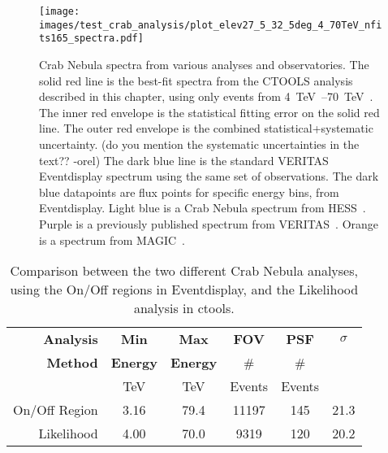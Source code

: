   \begin{figure}[!t]
    \centering
    \texttt{[image: images/test\_crab\_analysis/plot\_elev27\_5\_32\_5deg\_4\_70TeV\_nfits165\_spectra.pdf]}
    \caption[Crab Nebula Spectra]
    {
      Crab Nebula spectra from various analyses and observatories.
      The solid red line is the best-fit spectra from the CTOOLS analysis described in this chapter, using only events from \SIrange{4}{70}{\TeV{}}.
      The inner red envelope is the statistical fitting error on the solid red line.
      The outer red envelope is the combined statistical+systematic uncertainty.
      {\color{red}(do you mention the systematic uncertainties in the text?? -orel)}
      The dark blue line is the standard VERITAS Eventdisplay spectrum using the same set of observations.
      The dark blue datapoints are flux points for specific energy bins, from Eventdisplay.
      Light blue is a Crab Nebula spectrum from HESS~\cite{hess2006crab}.
      Purple is a previously published spectrum from VERITAS~\cite{veritas2015crab}.
      Orange is a spectrum from MAGIC~\cite{magic2015crab}.
    }
    \label{fig:crab_test_spectra}
  \end{figure}
    
  \begin{table}[!t]
    \centering
    \begin{tabular}{|r|c|c|c|c|c|}
      \hline
      \textbf{Analysis} & \textbf{Min}    & \textbf{Max}    & \textbf{FOV} & \textbf{PSF} & \textbf{$\sigma$} \\
      \textbf{Method}   & \textbf{Energy} & \textbf{Energy} &  \#          & \#           &                   \\
                        & TeV             & TeV             &  Events      & Events       &                   \\
      \hline 
      On/Off Region & 3.16 & 79.4 & 11197 & 145 & 21.3 \\
      Likelihood    & 4.00 & 70.0 & 9319  & 120 & 20.2 \\
      \hline 
    \end{tabular}
    \caption[Analysis Comparison]{
      Comparison between the two different Crab Nebula analyses, using the On/Off regions in Eventdisplay, and the Likelihood analysis in ctools.
    }
    \label{tab:crab_statistics}
  \end{table}

